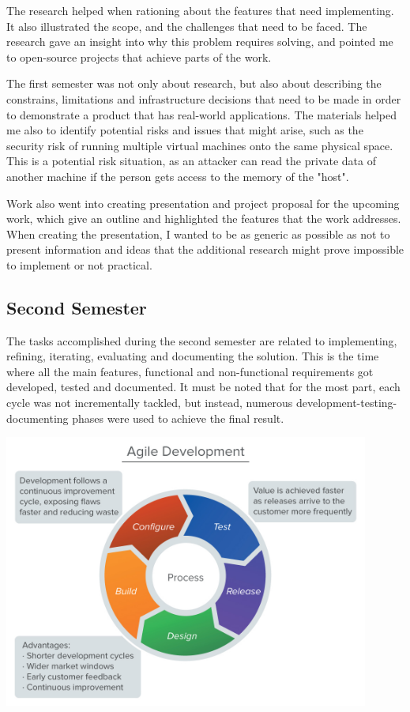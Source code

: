 \documentclass{article}
\begin{document}
The research helped when rationing about the features that need implementing. It also illustrated the scope, and the challenges that need to be faced. The research gave an insight into why this problem requires solving, and pointed me to open-source projects that achieve parts of the work.

The first semester was not only about research, but also about describing the constrains, limitations and infrastructure decisions that need to be made in order to demonstrate a  product that has real-world applications.
The materials helped me also to identify potential risks and issues that might arise, such as the security risk of running multiple virtual machines onto the same physical space. This is a potential risk situation, as an attacker can read the private data of another machine if the person gets access to the memory of the "host".

Work also went into creating presentation and project proposal for the upcoming work, which give an outline and highlighted the features that the work addresses.
When creating the presentation, I wanted to be as generic as possible as not to present information and ideas that the additional research might prove impossible to implement or not practical.

\subsection{Second Semester}

The tasks accomplished during the second semester are related to implementing, refining, iterating, evaluating and documenting the solution. This is the time where all the main features, functional and non-functional requirements got developed, tested and documented. It must be noted that for the most part, each cycle was not incrementally tackled, but instead, numerous development-testing-documenting phases were used to achieve the final result.
\begin{center}
    \includegraphics[width=12cm]{agile.jpg}
\end{center}
\end{document}
